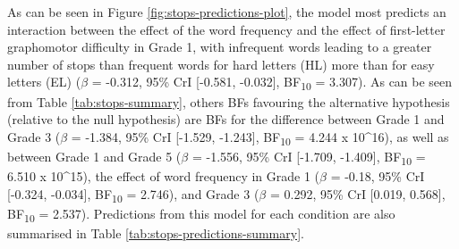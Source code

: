 \documentclass[
  11pt,
  english,
  ,doc,floatsintext]{apa6}
\begin{document}
As can be seen in Figure \ref{fig:stops-predictions-plot}, the model most predicts an interaction between the effect of the word frequency and the effect of first-letter graphomotor difficulty in Grade 1, with infrequent words leading to a greater number of stops than frequent words for hard letters (HL) more than for easy letters (EL)
(\(\beta\) = -0.312, 95\% CrI {[}-0.581, -0.032{]}, BF\textsubscript{10} = 3.307). As can be seen from Table \ref{tab:stops-summary}, others BFs favouring the alternative hypothesis (relative to the null hypothesis) are BFs for the difference between Grade 1 and Grade 3 (\(\beta\) = -1.384, 95\% CrI {[}-1.529, -1.243{]}, BF\textsubscript{10} = 4.244 x 10\^{}16), as well as between Grade 1 and Grade 5 (\(\beta\) = -1.556, 95\% CrI {[}-1.709, -1.409{]}, BF\textsubscript{10} = 6.510 x 10\^{}15), the effect of word frequency in Grade 1 (\(\beta\) = -0.18, 95\% CrI {[}-0.324, -0.034{]}, BF\textsubscript{10} = 2.746), and Grade 3 (\(\beta\) = 0.292, 95\% CrI {[}0.019, 0.568{]}, BF\textsubscript{10} = 2.537). Predictions from this model for each condition are also summarised in Table \ref{tab:stops-predictions-summary}.
\end{document}
